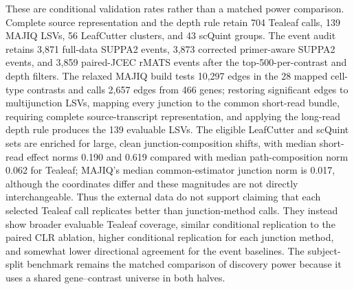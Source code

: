 \documentclass[11pt]{article}
\begin{document}
These are conditional validation rates rather than a matched power comparison. Complete source representation and the depth rule retain 704 Tealeaf calls, 139 MAJIQ LSVs, 56 LeafCutter clusters, and 43 scQuint groups. The event audit retains 3,871 full-data SUPPA2 events, 3,873 corrected primer-aware SUPPA2 events, and 3,859 paired-JCEC rMATS events after the top-500-per-contrast and depth filters. The relaxed MAJIQ build tests 10,297 edges in the 28 mapped cell-type contrasts and calls 2,657 edges from 466 genes; restoring significant edges to multijunction LSVs, mapping every junction to the common short-read bundle, requiring complete source-transcript representation, and applying the long-read depth rule produces the 139 evaluable LSVs. The eligible LeafCutter and scQuint sets are enriched for large, clean junction-composition shifts, with median short-read effect norms 0.190 and 0.619 compared with median path-composition norm 0.062 for Tealeaf; MAJIQ's median common-estimator junction norm is 0.017, although the coordinates differ and these magnitudes are not directly interchangeable. Thus the external data do not support claiming that each selected Tealeaf call replicates better than junction-method calls. They instead show broader evaluable Tealeaf coverage, similar conditional replication to the paired CLR ablation, higher conditional replication for each junction method, and somewhat lower directional agreement for the event baselines. The subject-split benchmark remains the matched comparison of discovery power because it uses a shared gene--contrast universe in both halves.
\end{document}
